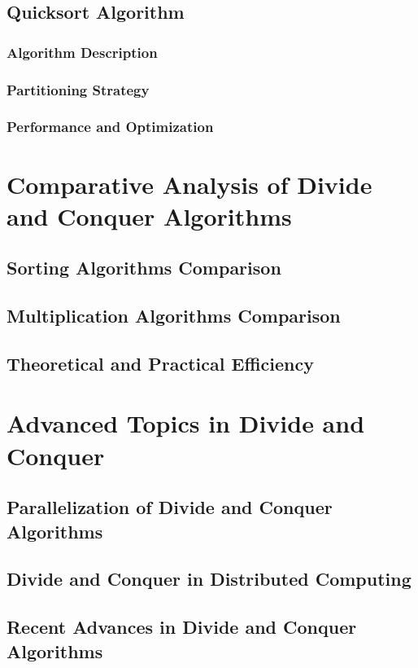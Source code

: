 \documentclass[12pt]{book} %
\begin{document}
\subsection{Quicksort Algorithm}
\subsubsection{Algorithm Description}
\subsubsection{Partitioning Strategy}
\subsubsection{Performance and Optimization}

\section{Comparative Analysis of Divide and Conquer Algorithms}
\subsection{Sorting Algorithms Comparison}
\subsection{Multiplication Algorithms Comparison}
\subsection{Theoretical and Practical Efficiency}

\section{Advanced Topics in Divide and Conquer}
\subsection{Parallelization of Divide and Conquer Algorithms}
\subsection{Divide and Conquer in Distributed Computing}
\subsection{Recent Advances in Divide and Conquer Algorithms}
\end{document}
